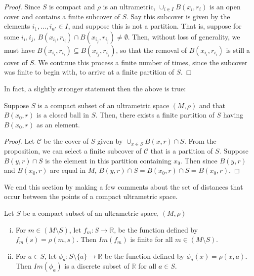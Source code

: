 \begin{proof}
Since $S$ is compact and $\rho$ is an ultrametric, $\cup_{i \in I} B(x_i,r_i)$ is an open cover and contains a finite subcover of $S$. Say this subcover is given by the elements  $i_1,\ldots, i_{n'} \in I$, and suppose this is not a partition. That is, suppose for some $i_i, i_j$, $ B(x_{i_i},r_{i_i}) \cap  B(x_{i_j},r_{i_j}) \neq \emptyset$. Then, without loss of generality, we must have $ B(x_{i_i},r_{i_i}) \subseteq  B(x_{i_j},r_{i_j})$, so that the removal of $ B(x_{i_i},r_{i_i})$ is still a cover of $S$. We continue this process a finite number of times, since the subcover was finite to begin with, to arrive at a finite partition of $S$.
\end{proof}

In fact, a slightly stronger statement then the above is true:

\begin{corollary}
Suppose $S$ is a compact subset of an ultrametric space $(M, \rho)$ and that $B(x_0,r)$ is a closed ball in $S$. Then, there exists a finite partition of $S$ having $B(x_0,r)$ as an element.
\end{corollary}

\begin{proof}
Let $\mathcal{C}$ be the cover of $S$ given by $\cup_{x\in S} B(x,r) \cap S$. From the proposition, we can select a finite subcover of $\mathcal{C}$ that is a partition of $S$. Suppose $B(y,r) \cap S$ is the element in this partition containing $x_0$. Then  since $B(y,r)$ and $B(x_0,r)$ are equal in $M$, $B(y,r) \cap S = B(x_0,r) \cap S = B(x_0,r)$.
\end{proof}

We end this section by making a few comments about the set of distances that occur between the points of a compact ultrametric space.\\

\begin{proposition}
\cite{ar} Let $S$ be a compact subset of an ultrametric space, $(M, \rho)$
\begin{enumerate}[(i)]
\item For $m \in (M \setminus S)$, let $f_m:S \rightarrow \mathbb{R}$, be the function defined by $f_m(s) = \rho(m,s)$. Then $Im(f_m)$ is finite for all $m \in (M \setminus S)$.
\item For $a \in S$, let $\phi_a: S \setminus \{a\} \rightarrow \mathbb{R}$ be the function defined by $\phi_a(x)=\rho(x,a)$. Then $Im(\phi_a)$ is a discrete subset of $\mathbb{R}$ for all $a \in S$.
\end{enumerate}
\end{proposition}


